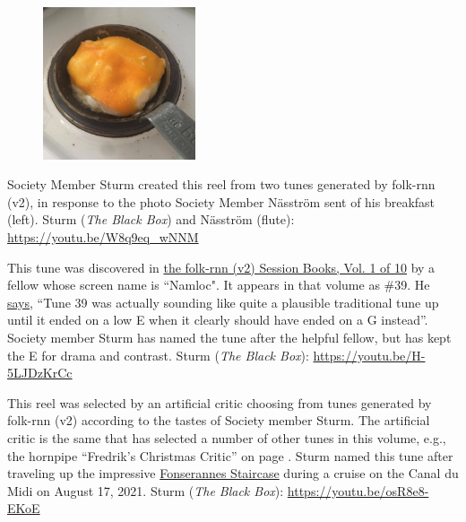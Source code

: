 \documentclass[a4paper,notitlepage,twoside]{book}
\begin{document}
{}  
  
\hypertarget{reel:DresstheEggwithaHat}{}
\begin{figure}
\vspace{-0.3in}
\includegraphics[width=0.4\textwidth]{eggwithahat.jpg}
\end{figure}
Society Member Sturm created this reel from 
two tunes generated by folk-rnn (v2),
in response to the photo Society Member Näsström
sent of his breakfast (left).
Sturm ({\em The Black Box}) and Näsström (flute): \url{https://youtu.be/W8q9eq_wNNM}
\clearpage

{}  
  
\hypertarget{reel:Namlocs}{}
This tune was discovered in \href{https://highnoongmt.wordpress.com/2018/01/05/volumes-1-20-of-folk-rnn-v1-transcriptions}{the folk-rnn (v2) Session Books, Vol. 1 of 10}
by a fellow whose screen name is ``Namloc". 
It appears in that volume as \#39. 
He \href{https://thesession.org/discussions/39604}{says}, ``Tune 39 was actually sounding 
like quite a plausible traditional tune up until it ended on a low E 
when it clearly should have ended on a G instead''. 
Society member Sturm has named the tune after the helpful fellow, 
but has kept the E for drama and contrast.
Sturm ({\em The Black Box}): \url{https://youtu.be/H-5LJDzKrCc}

{}
\hypertarget{reel:FonserannesStaircase}{}
This reel was selected by an artificial critic choosing from tunes generated by folk-rnn (v2)
according to the tastes of Society member Sturm.
The artificial critic is the same that has selected a number of other tunes in this volume, 
e.g., the hornpipe ``Fredrik's Christmas Critic'' on page \pageref{hornpipe:FredriksChristmasCritic}.
Sturm named this tune after traveling up the impressive 
\href{https://en.wikipedia.org/wiki/Fonseranes_Locks}{Fonserannes Staircase} during a 
cruise on the Canal du Midi on August 17, 2021.
Sturm ({\em The Black Box}): \url{https://youtu.be/osR8e8-EKoE}
\end{document}
